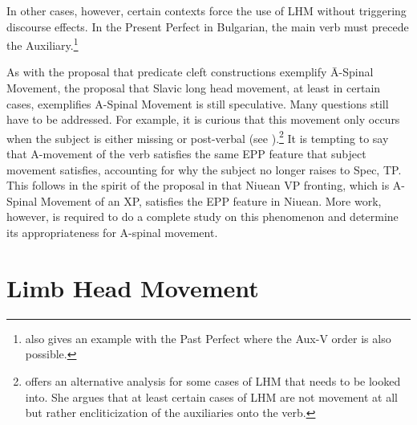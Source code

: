 \documentclass[output=paper,colorlinks,citecolor=brown,
]{langscibook}
\begin{document}
\ea\label{ex:LHMtoC}
    \z
\z

In other cases, however, certain contexts force the use of LHM without triggering discourse effects.  In the Present Perfect in Bulgarian, the main verb must precede the Auxiliary.\footnote{\citet{Rivero:1994} also gives an example with the Past Perfect where the Aux-V order is also possible.}

\ea
    \z
\z

As with the proposal that predicate cleft constructions exemplify \=A-Spinal Movement, the proposal that Slavic long head movement, at least in certain cases, exemplifies A-Spinal Movement is still speculative.  Many questions still have to be addressed.  For example, it is curious that this movement only occurs when the subject is either missing or post-verbal (see \citet[322 and fn 1]{Rivero:1994}).\footnote{\citet{King:1996} offers an alternative analysis for some cases of LHM that needs to be looked into.  She argues that at least certain cases of LHM are not movement at all but rather encliticization of the auxiliaries onto the verb.}   It is tempting to say that A-movement of the verb satisfies the same EPP feature that subject movement satisfies, accounting for why the subject no longer raises to Spec, TP.  This follows in the spirit of the proposal in \citet{Massam:2001a} that Niuean VP fronting, which is A-Spinal Movement of an XP, satisfies the EPP feature in Niuean.  More work, however, is required to do a complete study on this phenomenon and determine its appropriateness for A-spinal movement.

\section{Limb Head Movement}
\end{document}
